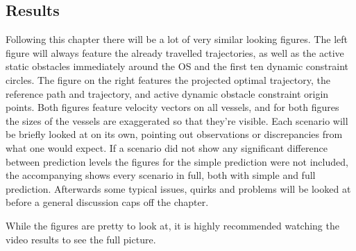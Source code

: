 \subsection{Results}
Following this chapter there will be a lot of very similar looking figures. The left figure will always feature the already travelled trajectories, %
as well as the active static obstacles immediately around the OS and the first ten dynamic constraint circles. The figure on the right features
the projected optimal trajectory, the reference path and trajectory, and active dynamic obstacle constraint origin points. Both
figures feature velocity vectors on all vessels, and for both figures the sizes of the vessels are exaggerated so that they're visible.
Each scenario will be briefly looked at on its own, pointing out observations or discrepancies from what one would expect. If a scenario did not show
any significant difference between prediction levels the figures for the simple prediction were not included, the accompanying shows
every scenario in full, both with simple and full prediction. Afterwards some typical issues, quirks and problems will be looked at before a general
discussion caps off the chapter.

While the figures are pretty to look at, it is highly recommended watching the video results to see the full picture.

